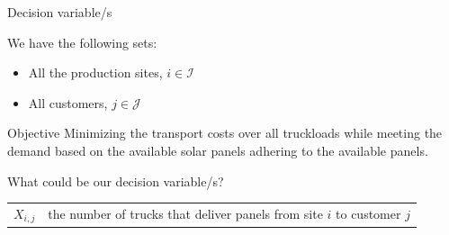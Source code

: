\documentclass[aspectratio=1610,12pt]{beamer}
\begin{document}
\begin{frame}[fragile]{Decision variable/s}
		\begin{block}{We have the following sets:}
			\begin{itemize}
				\item All the production sites, $i \in \mathcal{I}$
				\item All customers, $j \in \mathcal{J}$
			\end{itemize}
		\end{block}
		\begin{block}{Objective}
        \vspace{0.1cm}
    	     Minimizing the transport costs over all truckloads while meeting the demand based on the available solar panels adhering to the available panels. 
    	\end{block}
    	\vspace{0.1cm}
		\begin{block}{What could be our decision variable/s?}
		\pause
			\begin{tabular}{ll}
	            $X_{i,j}$ & the number of trucks that deliver panels from site $i$ to customer $j$
			\end{tabular}
		\end{block}
\end{frame}
\end{document}
